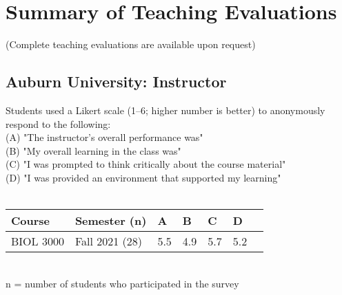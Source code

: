 \documentclass[11pt,a4paper,sans]{moderncv}        %
\begin{document}
\section{Summary of Teaching Evaluations}
{\footnotesize{(Complete teaching evaluations are available upon request)}}
\subsection{Auburn University: Instructor}
{Students used a Likert scale (1–6; higher number is better) to anonymously respond to the following:\\ (A) "The instructor's overall performance was"\\(B) "My overall learning in the class was"\\(C) "I was prompted to think critically about the course material"\\(D) "I was provided an environment that supported my learning"}\\ \\
\begin{tabular}{ p{3cm}p{3cm}p{1.5cm}p{1.5cm}p{1.5cm}p{1.5cm}p{1.5cm}  }
 \hline
Course & Semester (n) & A & B & C & D \\
 \hline
 BIOL 3000 & Fall 2021 (28) & 5.5 & 4.9 & 5.7 & 5.2  \\
 \hline
\end{tabular} \\
{\tiny{n = number of students who participated in the survey}} \par
\end{document}

